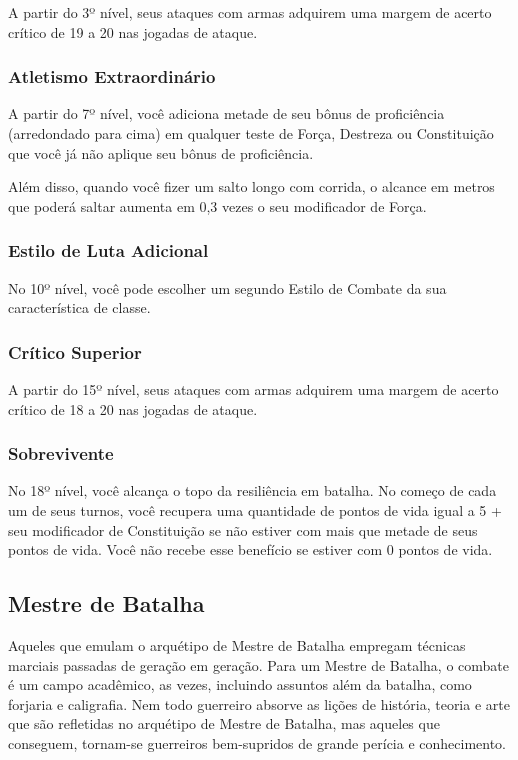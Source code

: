 \documentclass{RPG_Adventure}[2021/10/20]
\begin{document}
A partir do 3º nível, seus ataques com armas adquirem uma margem de acerto
crítico de 19 a 20 nas jogadas de ataque.

\subsubsection{Atletismo Extraordinário}%
\label{ssub:atletismo_extraordinario}

A partir do 7º nível, você adiciona metade de seu bônus de proficiência
(arredondado para cima) em qualquer teste de Força, Destreza ou Constituição que
você já não aplique seu bônus de proficiência.

Além disso, quando você fizer um salto longo com corrida, o alcance em metros
que poderá saltar aumenta em 0,3 vezes o seu modificador de Força.

\subsubsection{Estilo de Luta Adicional}%
\label{ssub:estilo_de_luta_adicional}

No 10º nível, você pode escolher um segundo Estilo de Combate da sua
característica de classe.

\subsubsection{Crítico Superior}%
\label{ssub:critico_superior}

A partir do 15º nível, seus ataques com armas adquirem uma margem de acerto
crítico de 18 a 20 nas jogadas de ataque.

\subsubsection{Sobrevivente}%
\label{ssub:sobrevivente}

No 18º nível, você alcança o topo da resiliência em batalha. No começo de cada
um de seus turnos, você recupera uma quantidade de pontos de vida igual a 5 +
seu modificador de Constituição se não estiver com mais que metade de seus
pontos de vida. Você não recebe esse benefício se estiver com 0 pontos de vida.

\subsection*{Mestre de Batalha}%
\label{sub:mestre_de_batalha}

Aqueles que emulam o arquétipo de Mestre de Batalha empregam técnicas marciais
passadas de geração em geração. Para um Mestre de Batalha, o combate é um campo
acadêmico, as vezes, incluindo assuntos além da batalha, como forjaria e
caligrafia. Nem todo guerreiro absorve as lições de história, teoria e arte que
são refletidas no arquétipo de Mestre de Batalha, mas aqueles que conseguem,
tornam-se guerreiros bem-supridos de grande perícia e conhecimento.
\end{document}
